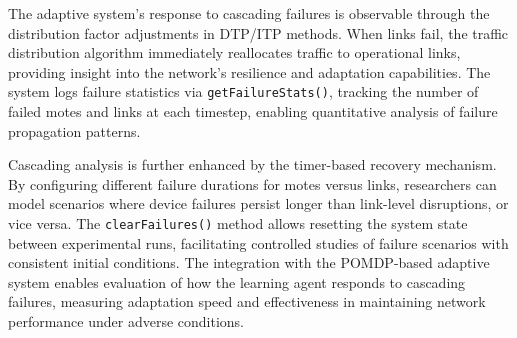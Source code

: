 \begin{itemize}
    The adaptive system's response to cascading failures is observable through the distribution factor adjustments in DTP/ITP methods. When links fail, the traffic distribution algorithm immediately reallocates traffic to operational links, providing insight into the network's resilience and adaptation capabilities. The system logs failure statistics via \texttt{getFailureStats()}, tracking the number of failed motes and links at each timestep, enabling quantitative analysis of failure propagation patterns.
    
    Cascading analysis is further enhanced by the timer-based recovery mechanism. By configuring different failure durations for motes versus links, researchers can model scenarios where device failures persist longer than link-level disruptions, or vice versa. The \texttt{clearFailures()} method allows resetting the system state between experimental runs, facilitating controlled studies of failure scenarios with consistent initial conditions. The integration with the POMDP-based adaptive system enables evaluation of how the learning agent responds to cascading failures, measuring adaptation speed and effectiveness in maintaining network performance under adverse conditions.
\end{itemize}
